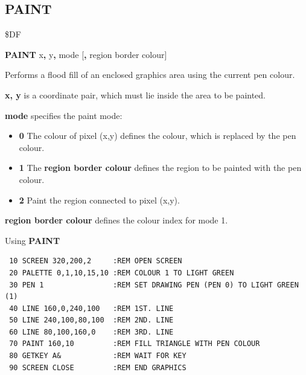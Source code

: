 
\newpage
\subsection{PAINT}
\begin{description}[leftmargin=2cm,style=nextline]
\item [Token:] \$DF
\item [Format:] {\bf PAINT} x{\bf,} y{\bf,} mode [{\bf,} region border colour]
\item [Usage:]  Performs a flood fill of an enclosed graphics area
                using the current pen colour.

                {\bf x, y} is a coordinate pair, which must
                lie inside the area to be painted.

                {\bf mode} specifies the paint mode:
                \begin{itemize}
                    \item {\bf 0} The colour of pixel (x,y) defines the colour,
                    which is replaced by the pen colour.

                    \item {\bf 1} The {\bf region border colour} defines
                    the region to be painted with the pen colour.

                    \item {\bf 2} Paint the region connected to pixel (x,y).
                \end{itemize}

                {\bf region border colour} defines the colour index for mode 1.

\item [Example:] Using {\bf PAINT}

\begin{tcolorbox}[colback=black,coltext=white]
\verbatimfont{\codefont}
\begin{verbatim}
 10 SCREEN 320,200,2     :REM OPEN SCREEN
 20 PALETTE 0,1,10,15,10 :REM COLOUR 1 TO LIGHT GREEN
 30 PEN 1                :REM SET DRAWING PEN (PEN 0) TO LIGHT GREEN (1)
 40 LINE 160,0,240,100   :REM 1ST. LINE
 50 LINE 240,100,80,100  :REM 2ND. LINE
 60 LINE 80,100,160,0    :REM 3RD. LINE
 70 PAINT 160,10         :REM FILL TRIANGLE WITH PEN COLOUR
 80 GETKEY A&            :REM WAIT FOR KEY
 90 SCREEN CLOSE         :REM END GRAPHICS
\end{verbatim}
\end{tcolorbox}
\end{description}

